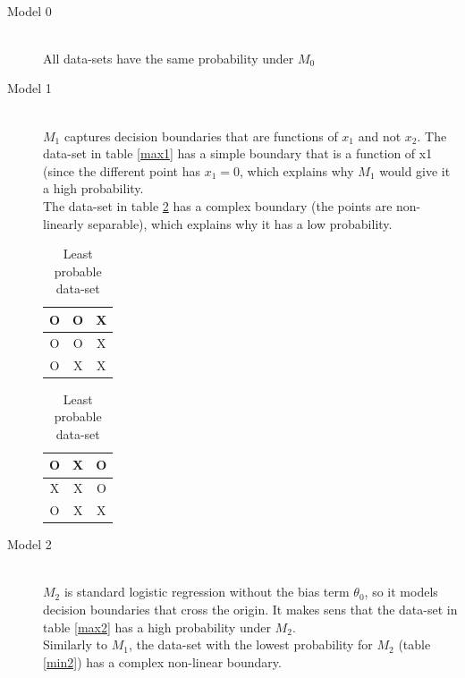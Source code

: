 \documentclass[a4paper,11pt]{article}
\theoremstyle{mytheor}
\begin{document}
\\
\begin{description}
\item[Model 0]\hfill \\
All data-sets have the same probability under $M_0$
\item[Model 1] \hfill \\
$M_1$ captures decision boundaries that are functions of $x_1$ and not $x_2$. The data-set in table \ref{max1} has a simple boundary that is a function of x1 (since the different point has $x_1 = 0$, which explains why $M_1$ would give it a high probability.\\
The data-set in table \ref{min1} has a complex boundary (the points are non-linearly separable), which explains why it has a low probability.
\begin{table}[h]
    \caption{Model 1}
    \begin{minipage}{.5\linewidth}
      \caption{Most probable data-set}
      \label{max1}
      \centering
        \begin{tabular}{c|c|c}
          O & O & X \\
          \hline
          O & O & X \\
          \hline
          O & X & X
        \end{tabular}
    \end{minipage}%
    \begin{minipage}{.5\linewidth}
      \centering
        \caption{Least probable data-set}
        \label{min1}
        \begin{tabular}{c|c|c}
          O & X & O \\
          \hline
          X & X & O \\
          \hline
          O & X & X
        \end{tabular}
    \end{minipage} 
\end{table}
\item[Model 2] \hfill \\
$M_2$ is standard logistic regression without the bias term $\theta_0$, so it models decision boundaries that cross the origin. It makes sens that the data-set in table \ref{max2} has a high probability under $M_2$. \\
Similarly to $M_1$, the data-set with the lowest probability for $M_2$ (table \ref{min2}) has a complex non-linear boundary.


\end{description}
\end{document}
